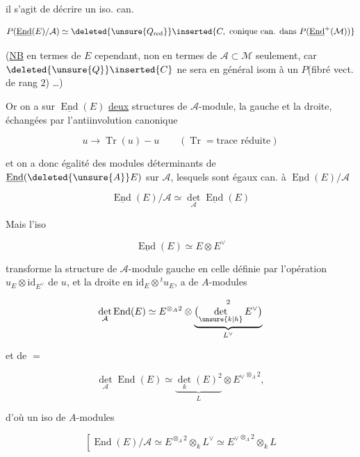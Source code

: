
il s'agit de décrire un iso. can.

\[
P(\underline{\operatorname{End}}(E)/\mathcal A)\simeq\deleted{\unsure{Q_{\mathrm{red}}}}\inserted{C,\ \text{conique can. dans }P(\underline{\operatorname{End}}^+(\mathcal M))}
\]

(\uline{NB} en termes de $E$ cependant, non en termes de $\mathcal A\subset\mathcal M$ seulement, car $\deleted{\unsure{Q}}\inserted{C}$ ne sera en général  isom à un $P$(fibré vect. de rang $2$) \ldots)

Or on a sur $\underline{\operatorname{End}}(E)$ \uline{deux} structures de $\mathcal A$-module, la gauche et la droite, échangées par l'antiinvolution canonique

\[
u\longrightarrow\operatorname{Tr}(u)-u\qquad(\operatorname{Tr}=\text{trace réduite})
\]

et on a donc égalité des modules déterminants de $\underline{\operatorname{End}}(\deleted{\unsure{A}}E)$ sur  $\mathcal A$, lesquels sont égaux can. à $\underline{\operatorname{End}}(E)/\mathcal A$

\[
\underline{\operatorname{End}}(E)/\mathcal A\simeq\det_{\mathcal A}\underline{\operatorname{End}}(E)
\]

Mais l'iso

\[
\underline{\operatorname{End}}(E)\simeq E\otimes E^\vee
\]

transforme la structure de $\mathcal A$-module gauche en celle définie par l'opération $u_E\otimes\mathrm{id}_{E^\vee}$ de $u$, et la droite en $\mathrm{id}_E\otimes{}^tu_E$,  a   de $A$-modules

\[
\det_{\mathcal A}\operatorname{End}(E)\simeq E^{\otimes_A2}\otimes\underbrace{\bigl(\det_{\unsure{k|h}}E^\vee\bigr)}_{L^\vee}^{2}
\]

et de $=$

\[
\det_{\mathcal A}\operatorname{End}(E)\simeq\underbrace{\det_k(E)^{2}}_{L}\otimes {E^\vee}^{\otimes_A2},
\]

d'où un iso de $A$-modules

\[
\left[\operatorname{End}(E)/\mathcal A\simeq E^{\otimes_A2}\otimes_k L^\vee\simeq {E^\vee}^{\otimes_A2}\otimes_k L\right.
\]
